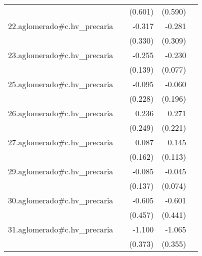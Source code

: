 {\begin{longtable}{l*{4}{D{.}{.}{-1}}}
            &                     &     (0.601)         &     (0.590)         &                     \\
\addlinespace
22.aglomerado#c.hv\_precaria&                     &      -0.317         &      -0.281         &                     \\
            &                     &     (0.330)         &     (0.309)         &                     \\
\addlinespace
23.aglomerado#c.hv\_precaria&                     &      -0.255         &      -0.230\sym{**} &                     \\
            &                     &     (0.139)         &     (0.077)         &                     \\
\addlinespace
25.aglomerado#c.hv\_precaria&                     &      -0.095         &      -0.060         &                     \\
            &                     &     (0.228)         &     (0.196)         &                     \\
\addlinespace
26.aglomerado#c.hv\_precaria&                     &       0.236         &       0.271         &                     \\
            &                     &     (0.249)         &     (0.221)         &                     \\
\addlinespace
27.aglomerado#c.hv\_precaria&                     &       0.087         &       0.145         &                     \\
            &                     &     (0.162)         &     (0.113)         &                     \\
\addlinespace
29.aglomerado#c.hv\_precaria&                     &      -0.085         &      -0.045         &                     \\
            &                     &     (0.137)         &     (0.074)         &                     \\
\addlinespace
30.aglomerado#c.hv\_precaria&                     &      -0.605         &      -0.601         &                     \\
            &                     &     (0.457)         &     (0.441)         &                     \\
\addlinespace
31.aglomerado#c.hv\_precaria&                     &      -1.100\sym{**} &      -1.065\sym{**} &                     \\
            &                     &     (0.373)         &     (0.355)         &                     \\

\end{longtable}}
